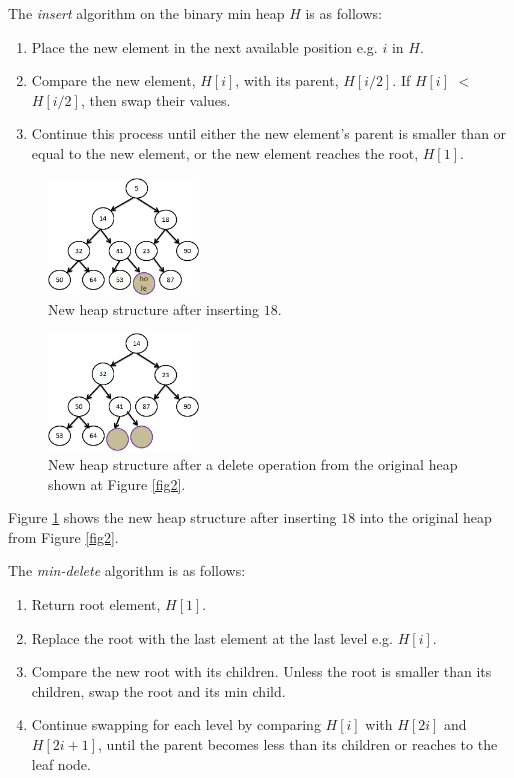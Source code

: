 \documentclass[10pt, conference, compsocconf]{IEEEtran}
\begin{document}
The {\it insert} algorithm on the binary min heap $H$ is as follows:
\begin{enumerate}
\item Place the new element in the next available position e.g. $i$ in $H$.
\item Compare the new element, $H[i]$, with its parent, $H[i/2]$. If $H[i]$ $<$ $H[i/2]$, then swap their values.
\item Continue this process until either the new element's parent is smaller than or equal to the new element, or the new element reaches the root, $H[1]$.
\end{enumerate}

\begin{figure}[!ht]
  \centering
  \includegraphics[width=4cm]{Figures/fig3.png}
      \caption{New heap structure after inserting $18$.}
    \label{fig3}
\end{figure}

\begin{figure}[!ht]
  \centering
  \includegraphics[width=4cm]{Figures/fig4.png}
      \caption{New heap structure after a delete operation from the original heap shown at Figure \ref{fig2}.}
    \label{fig4}
\end{figure}

Figure \ref{fig3} shows the new heap structure after inserting $18$ into the original heap from Figure \ref{fig2}.

The {\it min-delete} algorithm is as follows:
\begin{enumerate}
\item Return root element, $H[1]$.
\item Replace the root with the last element at the last level e.g. $H[i]$.
\item Compare the new root with its children. Unless the root is smaller than its children, swap the root and its min child.
\item Continue swapping for each level by comparing $H[i]$ with $H[2i]$ and $H[2i+1]$, until the parent becomes less than its children or reaches to the leaf node.
\end{enumerate}
\end{document}
